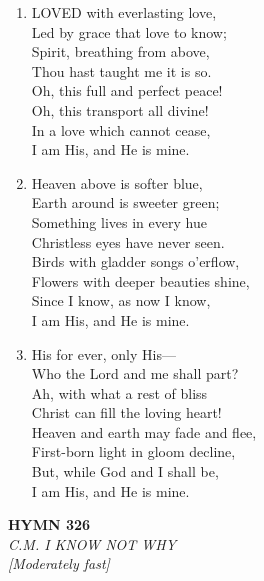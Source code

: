 \begin{enumerate}
    \item LOVED with everlasting love, \\
        Led by grace that love to know; \\
        Spirit, breathing from above, \\
        Thou hast taught me it is so. \\
        Oh, this full and perfect peace! \\
        Oh, this transport all divine! \\
        In a love which cannot cease, \\
        I am His, and He is mine.

    \item Heaven above is softer blue, \\
        Earth around is sweeter green; \\
        Something lives in every hue \\
        Christless eyes have never seen. \\
        Birds with gladder songs o'erflow, \\
        Flowers with deeper beauties shine, \\
        Since I know, as now I know, \\
        I am His, and He is mine.

    \item His for ever, only His--- \\
        Who the Lord and me shall part? \\
        Ah, with what a rest of bliss \\
        Christ can fill the loving heart! \\
        Heaven and earth may fade and flee, \\
        First-born light in gloom decline, \\
        But, while God and I shall be, \\
        I am His, and He is mine.

\end{enumerate}

\newpage
\begin{center}
    {\Large \textbf{HYMN 326}}
    \\
    \textit{C.M. I KNOW NOT WHY}
    \\
    \textit{\small [Moderately fast]}
\end{center}
\vspace{1em}

